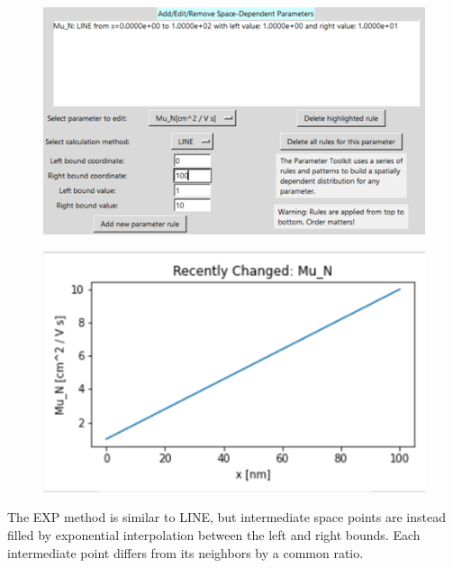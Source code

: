 \documentclass[11pt,letterpaper,titlepage]{article}
\begin{document}
		\begin{figure}[H]
			\label{fig:ptoolkit_line}
			\centering
			\includegraphics[scale=1]{"ptoolkit_line"}
		\end{figure}
		\begin{figure}[H]
			\label{fig:ptoolkit_line_plot}
			\centering
			\includegraphics[scale=1]{"ptoolkit_line_plot"}
		\end{figure}
		
		\par The EXP method is similar to LINE, but intermediate space points are instead filled by exponential interpolation between the left and right bounds. Each intermediate point differs from its neighbors by a common ratio.
		
\end{document}
